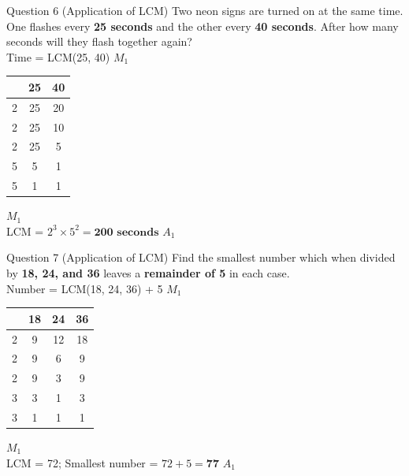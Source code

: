 \documentclass[12pt, a4paper, oneside]{article}
\begin{document}
\begin{solvingbox}{Question 6 (Application of LCM)}
Two neon signs are turned on at the same time. One flashes every \textbf{25 seconds} and the other every \textbf{40 seconds}. After how many seconds will they flash together again? \\
Time = LCM(25, 40) \hfill $M_1$ \\
\begin{tabular}{|c|c|c|} \hline
    & \textbf{25} & \textbf{40} \\ \hline
    2 & 25 & 20 \\ \hline
    2 & 25 & 10 \\ \hline
    2 & 25 & 5 \\ \hline
    5 & 5 & 1 \\ \hline
    5 & 1 & 1 \\ \hline
\end{tabular} \hfill $M_1$ \\
LCM = $2^3 \times 5^2 = \mathbf{200\text{ seconds}}$ \hfill $A_1$
\end{solvingbox}

\begin{solvingbox}{Question 7 (Application of LCM)}
Find the smallest number which when divided by \textbf{18, 24, and 36} leaves a \textbf{remainder of 5} in each case. \\
Number = LCM(18, 24, 36) + 5 \hfill $M_1$ \\
\begin{tabular}{|c|c|c|c|} \hline
    & \textbf{18} & \textbf{24} & \textbf{36} \\ \hline
    2 & 9 & 12 & 18 \\ \hline
    2 & 9 & 6 & 9 \\ \hline
    2 & 9 & 3 & 9 \\ \hline
    3 & 3 & 1 & 3 \\ \hline
    3 & 1 & 1 & 1 \\ \hline
\end{tabular} \hfill $M_1$ \\
LCM = 72; Smallest number = $72 + 5 = \mathbf{77}$ \hfill $A_1$
\end{solvingbox}
\end{document}
